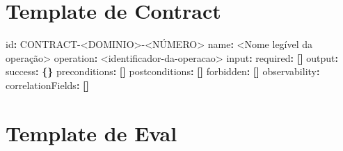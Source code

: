 \documentclass[
  10pt,
  a4paper,
  oneside]{book}
\newenvironment{Shaded}{}{}
\newcommand{\AttributeTok}[1]{\textcolor[rgb]{0.49,0.56,0.16}{#1}}
\newcommand{\FunctionTok}[1]{\textcolor[rgb]{0.02,0.16,0.49}{#1}}
\newcommand{\KeywordTok}[1]{\textcolor[rgb]{0.00,0.44,0.13}{\textbf{#1}}}
\begin{document}
\hypertarget{template-de-contract}{%
\section{Template de Contract}\label{template-de-contract}}

\begin{Shaded}
\begin{Highlighting}[]
\FunctionTok{id}\KeywordTok{:}\AttributeTok{ CONTRACT{-}\textless{}DOMINIO\textgreater{}{-}\textless{}NÚMERO\textgreater{}}
\FunctionTok{name}\KeywordTok{:}\AttributeTok{ \textless{}Nome legível da operação\textgreater{}}
\FunctionTok{operation}\KeywordTok{:}\AttributeTok{ \textless{}identificador{-}da{-}operacao\textgreater{}}
\FunctionTok{input}\KeywordTok{:}
\AttributeTok{  }\FunctionTok{required}\KeywordTok{:}\AttributeTok{ }\KeywordTok{[]}
\FunctionTok{output}\KeywordTok{:}
\AttributeTok{  }\FunctionTok{success}\KeywordTok{:}\AttributeTok{ }\KeywordTok{\{\}}
\FunctionTok{preconditions}\KeywordTok{:}\AttributeTok{ }\KeywordTok{[]}
\FunctionTok{postconditions}\KeywordTok{:}\AttributeTok{ }\KeywordTok{[]}
\FunctionTok{forbidden}\KeywordTok{:}\AttributeTok{ }\KeywordTok{[]}
\FunctionTok{observability}\KeywordTok{:}
\AttributeTok{  }\FunctionTok{correlationFields}\KeywordTok{:}\AttributeTok{ }\KeywordTok{[]}
\end{Highlighting}
\end{Shaded}

\hypertarget{template-de-eval}{%
\section{Template de Eval}\label{template-de-eval}}
\end{document}

